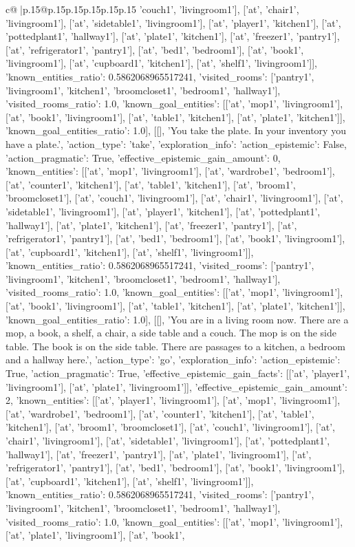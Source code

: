 \documentclass{article}
\begin{document}
{\begin{supertabular}{c@{$\;$}|p{.15\linewidth}@{}p{.15\linewidth}p{.15\linewidth}p{.15\linewidth}p{.15\linewidth}p{.15\linewidth}}
{{{'couch1', 'livingroom1'], ['at', 'chair1', 'livingroom1'], ['at', 'sidetable1', 'livingroom1'], ['at', 'player1', 'kitchen1'], ['at', 'pottedplant1', 'hallway1'], ['at', 'plate1', 'kitchen1'], ['at', 'freezer1', 'pantry1'], ['at', 'refrigerator1', 'pantry1'], ['at', 'bed1', 'bedroom1'], ['at', 'book1', 'livingroom1'], ['at', 'cupboard1', 'kitchen1'], ['at', 'shelf1', 'livingroom1']], 'known_entities_ratio': 0.5862068965517241, 'visited_rooms': ['pantry1', 'livingroom1', 'kitchen1', 'broomcloset1', 'bedroom1', 'hallway1'], 'visited_rooms_ratio': 1.0, 'known_goal_entities': [['at', 'mop1', 'livingroom1'], ['at', 'book1', 'livingroom1'], ['at', 'table1', 'kitchen1'], ['at', 'plate1', 'kitchen1']], 'known_goal_entities_ratio': 1.0}}], [[], 'You take the plate. In your inventory you have a plate.', {'action_type': 'take', 'exploration_info': {'action_epistemic': False, 'action_pragmatic': True, 'effective_epistemic_gain_amount': 0, 'known_entities': [['at', 'mop1', 'livingroom1'], ['at', 'wardrobe1', 'bedroom1'], ['at', 'counter1', 'kitchen1'], ['at', 'table1', 'kitchen1'], ['at', 'broom1', 'broomcloset1'], ['at', 'couch1', 'livingroom1'], ['at', 'chair1', 'livingroom1'], ['at', 'sidetable1', 'livingroom1'], ['at', 'player1', 'kitchen1'], ['at', 'pottedplant1', 'hallway1'], ['at', 'plate1', 'kitchen1'], ['at', 'freezer1', 'pantry1'], ['at', 'refrigerator1', 'pantry1'], ['at', 'bed1', 'bedroom1'], ['at', 'book1', 'livingroom1'], ['at', 'cupboard1', 'kitchen1'], ['at', 'shelf1', 'livingroom1']], 'known_entities_ratio': 0.5862068965517241, 'visited_rooms': ['pantry1', 'livingroom1', 'kitchen1', 'broomcloset1', 'bedroom1', 'hallway1'], 'visited_rooms_ratio': 1.0, 'known_goal_entities': [['at', 'mop1', 'livingroom1'], ['at', 'book1', 'livingroom1'], ['at', 'table1', 'kitchen1'], ['at', 'plate1', 'kitchen1']], 'known_goal_entities_ratio': 1.0}}], [[], 'You are in a living room now. There are a mop, a book, a shelf, a chair, a side table and a couch. The mop is on the side table. The book is on the side table. There are passages to a kitchen, a bedroom and a hallway here.', {'action_type': 'go', 'exploration_info': {'action_epistemic': True, 'action_pragmatic': True, 'effective_epistemic_gain_facts': [['at', 'player1', 'livingroom1'], ['at', 'plate1', 'livingroom1']], 'effective_epistemic_gain_amount': 2, 'known_entities': [['at', 'player1', 'livingroom1'], ['at', 'mop1', 'livingroom1'], ['at', 'wardrobe1', 'bedroom1'], ['at', 'counter1', 'kitchen1'], ['at', 'table1', 'kitchen1'], ['at', 'broom1', 'broomcloset1'], ['at', 'couch1', 'livingroom1'], ['at', 'chair1', 'livingroom1'], ['at', 'sidetable1', 'livingroom1'], ['at', 'pottedplant1', 'hallway1'], ['at', 'freezer1', 'pantry1'], ['at', 'plate1', 'livingroom1'], ['at', 'refrigerator1', 'pantry1'], ['at', 'bed1', 'bedroom1'], ['at', 'book1', 'livingroom1'], ['at', 'cupboard1', 'kitchen1'], ['at', 'shelf1', 'livingroom1']], 'known_entities_ratio': 0.5862068965517241, 'visited_rooms': ['pantry1', 'livingroom1', 'kitchen1', 'broomcloset1', 'bedroom1', 'hallway1'], 'visited_rooms_ratio': 1.0, 'known_goal_entities': [['at', 'mop1', 'livingroom1'], ['at', 'plate1', 'livingroom1'], ['at', 'book1', }}}
\end{supertabular}}
\end{document}
